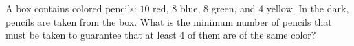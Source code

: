A box contains colored pencils: $10$ red, $8$ blue, $8$ green, and $4$ yellow. In the dark, pencils are taken from the box. What is the minimum number of pencils that must be taken to guarantee that at least $4$ of them are of the same color?
